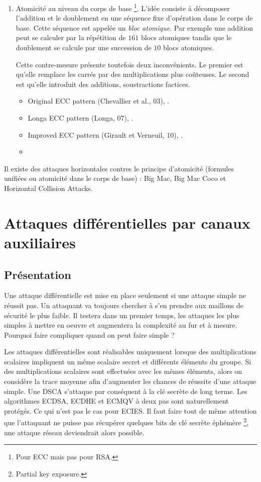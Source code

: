 \begin{description}
\begin{enumerate}
        \item Atomicité au niveau du corps de base \footnote{Pour ECC mais pas pour RSA.}. L'idée consiste à décomposer l'addition et le doublement en une séquence fixe d'opération dans le corps de base. Cette séquence est appelée un \emph{bloc atomique}. Par exemple une addition peut se calculer par la répétition de $161$ blocs atomiques tandis que le doublement se calcule par une succession de $10$ blocs atomiques. 
        
        Cette contre-mesure présente toutefois deux inconvénients. Le premier est qu'elle remplace les carrés par des multiplications plus coûteuses. Le second est qu'elle introduit des additions, soustractions factices.
        \begin{itemize}[label=--]
            \item Original ECC pattern (Chevallier et al., 03), \cite{chevallier2004low}. 
            \item Longa ECC pattern (Longa, 07), \cite{longa2007accelerating}.
            \item Improved ECC pattern (Girault et Verneuil, 10), \cite{giraud2010atomicity}.
            \item \cite{rondepierre2014revisiting}
        \end{itemize}    
    \end{enumerate}
\end{description}

Il existe des attaques horizontales contres le principe d'atomicité (formules unifiées ou atomicité dans le corps de base) : Big Mac, Big Mac Coco et Horizontal Collision Attacks.


\section{Attaques différentielles par canaux auxiliaires}
\subsection{Présentation}
Une attaque différentielle est mise en place seulement si une attaque simple ne réussit pas. Un attaquant va toujours chercher à s'en prendre aux maillons de sécurité le plus faible. Il testera dans un premier temps, les attaques les plus simples à mettre en oeuvre et augmentera la complexité au fur et à mesure. Pourquoi faire compliquer quand on peut faire simple ?

Les attaques différentielles sont réalisables uniquement lorsque des multiplications scalaires impliquent un même scalaire secret et différents éléments du groupe. Si des multiplications scalaires sont effectuées avec les mêmes éléments, alors on considère la trace moyenne afin d'augmenter les chances de réussite d'une attaque simple. Une DSCA s'attaque par conséquent à la clé secrète de long terme. Les algorithmes ECDSA, ECDHE et ECMQV à deux pas sont naturellement protégés. Ce qui n'est pas le cas pour ECIES. Il faut faire tout de même attention que l'attaquant ne puisse pas récupérer quelques bits de clé secrète éphémère \footnote{Partial key exposure.}, une attaque réseau deviendrait alors possible.

